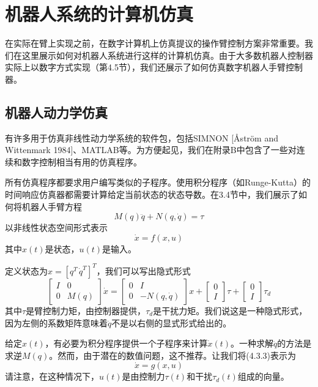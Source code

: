\documentclass[UTF8]{ctexart}
\theoremstyle{definition}
\begin{document}
\section{机器人系统的计算机仿真}

在实际在臂上实现之前，在数字计算机上仿真提议的操作臂控制方案非常重要。我们在这里展示如何对机器人系统进行这样的计算机仿真。由于大多数机器人控制器实际上以数字方式实现（第4.5节），我们还展示了如何仿真数字机器人手臂控制器。

\subsection{机器人动力学仿真}

有许多用于仿真非线性动力学系统的软件包，包括SIMNON [Åström and Wittenmark 1984]、MATLAB等。为方便起见，我们在附录B中包含了一些对连续和数字控制相当有用的仿真程序。

所有仿真程序都要求用户编写类似的子程序。使用积分程序（如Runge-Kutta）的时间响应仿真器都需要计算给定当前状态的状态导数。在3.4节中，我们展示了如何将机器人手臂方程
\begin{equation}
    M(q)\ddot{q} + N(q, \dot{q}) = \tau
\end{equation}
以非线性状态空间形式表示
\begin{equation}
    \dot{x} = f(x, u)
\end{equation}
其中$x(t)$是状态，$u(t)$是输入。

定义状态为$x = [q^T \, \dot{q}^T]^T$，我们可以写出隐式形式
\begin{equation}
    \begin{bmatrix} I & 0 \\ 0 & M(q) \end{bmatrix} \dot{x} = \begin{bmatrix} 0 & I \\ 0 & -N(q, \dot{q}) \end{bmatrix} x + \begin{bmatrix} 0 \\ I \end{bmatrix} \tau + \begin{bmatrix} 0 \\ I \end{bmatrix} \tau_d
\end{equation}
其中$\tau$是臂控制力矩，由控制器提供，$\tau_d$是干扰力矩。我们说这是一种隐式形式，因为左侧的系数矩阵意味着$\ddot{q}$不是以右侧的显式形式给出的。

给定$x(t)$，有必要为积分程序提供一个子程序来计算$\dot{x}(t)$。一种求解$\ddot{q}$的方法是求逆$M(q)$。然而，由于潜在的数值问题，这不推荐。让我们将(4.3.3)表示为
\begin{equation}
    \dot{x} = g(x, u)
\end{equation}
请注意，在这种情况下，$u(t)$是由控制力$\tau(t)$和干扰$\tau_d(t)$组成的向量。
\end{document}
